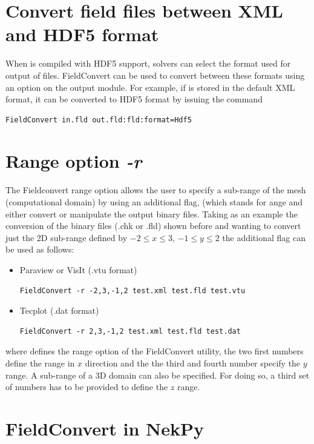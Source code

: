 \section{Convert field files between XML and HDF5 format}
%
When \nekpp is compiled with HDF5 support, solvers can select the format used
for output of  files. FieldConvert can be used to convert between
these formats using an option on the  output module. For example, if
 is stored in the default XML format, it can be converted to HDF5
format by issuing the command
%
\begin{lstlisting}[style=BashInputStyle]
FieldConvert in.fld out.fld:fld:format=Hdf5
\end{lstlisting}
%
\section{Range option \textit{-r}}
The Fieldconvert range option  allows the user to specify
a sub-range of the mesh (computational domain) by using an
additional flag,  (which stands for ange and either
convert or manipulate the \nekpp output binary files.
Taking as an example the conversion of the \nekpp binary files
(.chk or .fld) shown before and wanting to convert just the 2D
sub-range defined by $-2\leq x \leq 3$, $-1\leq y \leq 2$ the
additional flag  can be used as follows:
%
\begin{itemize}
\item Paraview or VisIt (.vtu format)
%
\begin{lstlisting}[style=BashInputStyle]
FieldConvert -r -2,3,-1,2 test.xml test.fld test.vtu
\end{lstlisting}
%
\item Tecplot (.dat format)
%
\begin{lstlisting}[style=BashInputStyle]
FieldConvert -r 2,3,-1,2 test.xml test.fld test.dat
\end{lstlisting}
%
\end{itemize}
where  defines the range option of the FieldConvert
utility, the two first numbers define the range in $x$ direction
and the the third and fourth number specify the $y$ range.
A sub-range of a 3D domain can also be specified.
For doing so, a third set of numbers has to be provided
to define the $z$ range.
%
%
%

\section{FieldConvert in NekPy}

